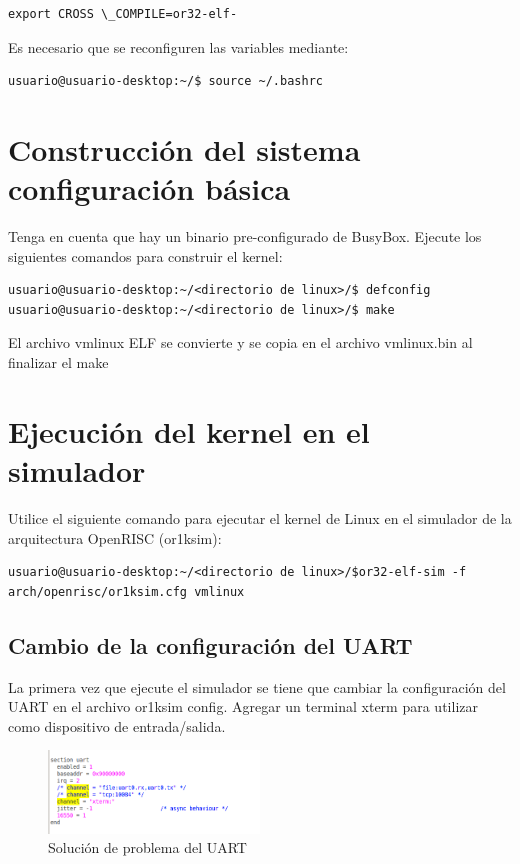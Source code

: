 \begin{lstlisting}[breaklines]
export CROSS \_COMPILE=or32-elf-
\end{lstlisting}

Es necesario que se reconfiguren las variables mediante:
\begin{lstlisting}[breaklines]
 usuario@usuario-desktop:~/$ source ~/.bashrc
\end{lstlisting}
\section{Construcción del sistema configuración básica}

Tenga en cuenta que hay un binario pre-configurado de BusyBox. Ejecute los siguientes comandos para construir el kernel:


\begin{lstlisting}[breaklines]
usuario@usuario-desktop:~/<directorio de linux>/$ defconfig
usuario@usuario-desktop:~/<directorio de linux>/$ make
\end{lstlisting}

El archivo vmlinux ELF se convierte y se copia en el archivo vmlinux.bin al finalizar el make

\section{Ejecución del kernel en el simulador}

Utilice el siguiente comando para ejecutar el kernel de Linux en el simulador de la arquitectura OpenRISC (or1ksim): 

\begin{lstlisting}[breaklines]
usuario@usuario-desktop:~/<directorio de linux>/$or32-elf-sim -f arch/openrisc/or1ksim.cfg vmlinux
\end{lstlisting}
 
\subsection{Cambio de la configuración del UART}

La primera vez que ejecute el simulador se tiene que cambiar la configuración del UART en el archivo or1ksim  config. Agregar un terminal xterm para utilizar como dispositivo de entrada/salida.

\begin{figure}[h!]
 	\begin{center}
  	\includegraphics[width=0.5\textwidth,keepaspectratio=true]{./images/uart}
  	\caption{Solución de problema del UART}
 	\end{center}
	\end{figure}


